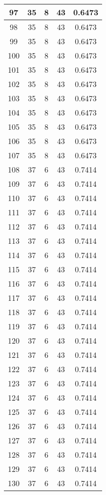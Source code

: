 \documentclass[letterpaper, 12pt]{article}
\begin{document}
\begin{longtable}{|c|c|c|c|c|}
\hline
97 & 35 & 8 & 43 & 0.6473 \\
\hline
98 & 35 & 8 & 43 & 0.6473 \\
\hline
99 & 35 & 8 & 43 & 0.6473 \\
\hline
100 & 35 & 8 & 43 & 0.6473 \\
\hline
101 & 35 & 8 & 43 & 0.6473 \\
\hline
102 & 35 & 8 & 43 & 0.6473 \\
\hline
103 & 35 & 8 & 43 & 0.6473 \\
\hline
104 & 35 & 8 & 43 & 0.6473 \\
\hline
105 & 35 & 8 & 43 & 0.6473 \\
\hline
106 & 35 & 8 & 43 & 0.6473 \\
\hline
107 & 35 & 8 & 43 & 0.6473 \\
\hline
108 & 37 & 6 & 43 & 0.7414 \\
\hline
109 & 37 & 6 & 43 & 0.7414 \\
\hline
110 & 37 & 6 & 43 & 0.7414 \\
\hline
111 & 37 & 6 & 43 & 0.7414 \\
\hline
112 & 37 & 6 & 43 & 0.7414 \\
\hline
113 & 37 & 6 & 43 & 0.7414 \\
\hline
114 & 37 & 6 & 43 & 0.7414 \\
\hline
115 & 37 & 6 & 43 & 0.7414 \\
\hline
116 & 37 & 6 & 43 & 0.7414 \\
\hline
117 & 37 & 6 & 43 & 0.7414 \\
\hline
118 & 37 & 6 & 43 & 0.7414 \\
\hline
119 & 37 & 6 & 43 & 0.7414 \\
\hline
120 & 37 & 6 & 43 & 0.7414 \\
\hline
121 & 37 & 6 & 43 & 0.7414 \\
\hline
122 & 37 & 6 & 43 & 0.7414 \\
\hline
123 & 37 & 6 & 43 & 0.7414 \\
\hline
124 & 37 & 6 & 43 & 0.7414 \\
\hline
125 & 37 & 6 & 43 & 0.7414 \\
\hline
126 & 37 & 6 & 43 & 0.7414 \\
\hline
127 & 37 & 6 & 43 & 0.7414 \\
\hline
128 & 37 & 6 & 43 & 0.7414 \\
\hline
129 & 37 & 6 & 43 & 0.7414 \\
\hline
130 & 37 & 6 & 43 & 0.7414 \\

\end{longtable}
\end{document}
